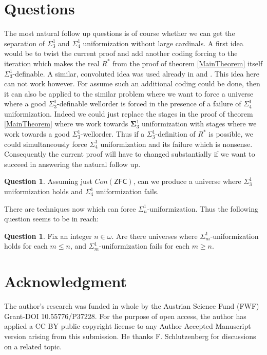 \documentclass{article}
\theoremstyle{plain}
\theoremstyle{definition}
\newtheorem{question}[theorem]{Question}
\begin{document}
\section{Questions}
The most natural follow up questions is of course whether we can get the separation of $\Sigma^1_3$ and $\Sigma^1_4$ uniformization without large cardinals. A first idea would be to twist the current proof and add another coding forcing to the iteration which makes the real $R^*$ from the proof of theorem \ref{MainTheorem} itself $\Sigma^1_3$-definable. A similar, convoluted idea was used already in \cite{Ho1} and \cite{hoffelner2025forcinguppersigmauniformizationpresence}. 
This idea here can not work however. For assume such an additional coding could be done, then it can also be applied to the similar problem where we want to force a universe where a good $\Sigma^1_3$-definable wellorder is forced in the presence of a failure of $\Sigma^1_4$ uniformization. Indeed we could just replace the stages in the proof of theorem \ref{MainTheorem} where we work towards $\boldsymbol{\Sigma}^1_3$ uniformization with stages where we work towards a good $\Sigma^1_3$-wellorder. Thus if a $\Sigma^1_3$-definition of $R^*$ is possible, we could simultaneously force $\Sigma^1_4$ uniformization and its failure which is nonsense. Consequently the current proof will have to changed substantially if we want to succeed in answering the natural follow up.
\begin{question}
    Assuming just $Con(\mathsf{ZFC})$, can we produce a universe where $\Sigma^1_3$ uniformization holds and $\Sigma^1_4$ uniformization fails.
    \end{question}
There are techniques now which can force $\Sigma^1_n$-uniformization. Thus the following question seems to be in reach:
\begin{question}
    Fix an integer $n \in \omega$. Are there universes where $\Sigma^1_m$-uniformization holds for each $m \le n$, and $\Sigma^1_m$-uniformization fails for each $m \ge n$.
\end{question}

\section{Acknowledgment}
The author's research was funded in whole by the Austrian Science Fund (FWF) Grant-DOI 10.55776/P37228. For the purpose of open access, the author has applied a CC BY public copyright license to any Author Accepted Manuscript version arising from this submission. He thanks F. Schlutzenberg for discussions on a related topic.


\end{document}
